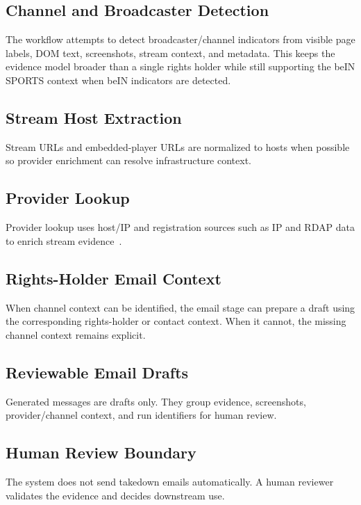 \subsection{Channel and Broadcaster Detection}

The workflow attempts to detect broadcaster/channel indicators from visible
page labels, DOM text, screenshots, stream context, and metadata. This keeps
the evidence model broader than a single rights holder while still supporting
the beIN SPORTS context when beIN indicators are detected.

\subsection{Stream Host Extraction}

Stream URLs and embedded-player URLs are normalized to hosts when possible so
provider enrichment can resolve infrastructure context.

\subsection{Provider Lookup}

Provider lookup uses host/IP and registration sources such as IP and RDAP data
to enrich stream evidence~\cite{ipinfo-api,icann-rdap}.

\subsection{Rights-Holder Email Context}

When channel context can be identified, the email stage can prepare a draft
using the corresponding rights-holder or contact context. When it cannot, the
missing channel context remains explicit.

\subsection{Reviewable Email Drafts}

Generated messages are drafts only. They group evidence, screenshots,
provider/channel context, and run identifiers for human review.

\subsection{Human Review Boundary}

The system does not send takedown emails automatically. A human reviewer
validates the evidence and decides downstream use.

